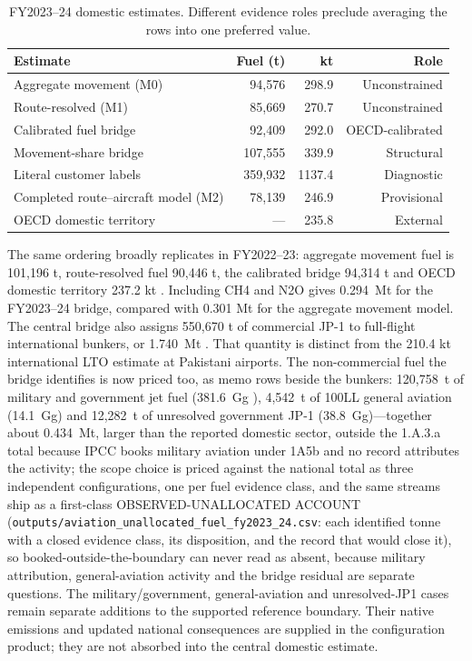 \begin{table}[htbp]
\centering
\scriptsize
\begin{tabular}{@{}lrrr@{}}
\toprule
\textbf{Estimate} & \textbf{Fuel (t)} & \textbf{kt \COtwo{}} & \textbf{Role} \\
\midrule
Aggregate movement (M0) & 94,576 & 298.9 & Unconstrained \\
Route-resolved (M1) & 85,669 & 270.7 & Unconstrained \\
Calibrated fuel bridge & 92,409 & 292.0 & OECD-calibrated \\
Movement-share bridge & 107,555 & 339.9 & Structural \\
Literal customer labels & 359,932 & 1137.4 & Diagnostic \\
Completed route--aircraft model (M2) & 78,139 & 246.9 & Provisional \\
OECD domestic territory & --- & 235.8 & External \\
\bottomrule
\end{tabular}
\caption{FY2023--24 domestic \COtwo{} estimates. Different evidence roles preclude averaging
the rows into one preferred value.}
\label{tab:bridge-results}
\end{table}

The same ordering broadly replicates in FY2022--23: aggregate movement fuel is 101,196 t,
route-resolved fuel 90,446 t, the calibrated bridge 94,314 t and OECD domestic territory
237.2 kt \COtwo{}. Including CH4 and N2O gives
\SI{0.294}{\mega\tonne} \COe{} for the FY2023--24 bridge, compared with 0.301 Mt for the
aggregate movement model. The central bridge also assigns 550,670 t of commercial JP-1 to
full-flight international bunkers, or \SI{1.740}{\mega\tonne} \COtwo{}. That quantity is
distinct from the 210.4 kt international LTO estimate at Pakistani airports. The
non-commercial fuel the bridge identifies is now priced too, as memo rows beside the
bunkers: 120,758~t of military and government jet fuel (\SI{381.6}{\giga\gram}
\COtwo{}), 4,542~t of 100LL general aviation (\SI{14.1}{\giga\gram}) and 12,282~t of
unresolved government JP-1 (\SI{38.8}{\giga\gram})---together about
\SI{0.434}{\mega\tonne}, larger than the reported domestic sector, outside the
1.A.3.a total because IPCC books military aviation under 1A5b and no record attributes
the activity; the scope choice is priced against the national total as three
independent configurations, one per fuel evidence class, and the same
streams ship as a first-class OBSERVED-UNALLOCATED ACCOUNT
(\texttt{outputs/aviation\_unallocated\_fuel\_fy2023\_24.csv}: each identified tonne
with a closed evidence class, its disposition, and the record that would close
it), so booked-outside-the-boundary can never read as absent, because military
attribution, general-aviation activity and the bridge residual are separate
questions. The military/government, general-aviation and unresolved-JP1 cases remain separate additions to the supported reference boundary. Their native emissions and updated national consequences are supplied in the configuration product; they are not absorbed into the central domestic estimate.


